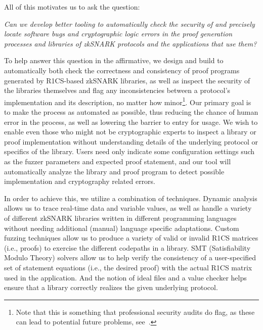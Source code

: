 All of this motivates us to ask the question:

\smallskip
\noindent\emph{Can we develop better tooling to automatically check the security of and precisely locate software bugs and cryptographic logic errors in the proof generation processes and libraries of zkSNARK protocols and the applications that use them?}
\smallskip

To help answer this question in the affirmative, we design and build \snarkprobe to automatically both check the correctness and consistency of proof programs generated by R1CS-based zkSNARK libraries, as well as inspect the security of the libraries themselves and flag any inconsistencies between a protocol's implementation and its description, no matter how minor\footnote{Note that this is something that professional security audits do flag, as these can lead to potential future problems, see~\cite{zcashaudit}.}.  Our primary goal is to make the process as automated as possible, thus reducing the chance of human error in the process, as well as lowering the barrier to entry for usage.  We wish to enable even those who might not be cryptographic experts to inspect a library or proof implementation without understanding details of the underlying protocol or specifics of the library.  Users need only indicate some configuration settings such as the fuzzer parameters and expected proof statement, and our tool will automatically analyze the library and proof program to detect possible implementation and cryptography related errors.

In order to achieve this, we utilize a combination of techniques.
Dynamic analysis allows us to trace real-time data and variable values, as well as handle a variety of different zkSNARK libraries written in different programming languages without needing additional (manual) language specific adaptations.
Custom fuzzing techniques allow us to produce a variety of valid or invalid R1CS matrices (i.e., proofs) to exercise the different codepaths in a library.
SMT (Satisfiability Modulo Theory) solvers allow us to help verify the consistency of a user-specified set of statement equations (i.e., the desired proof) with the actual R1CS matrix used in the application.
And the notion of ideal files and a value checker helps ensure that a library correctly realizes the given underlying protocol.

